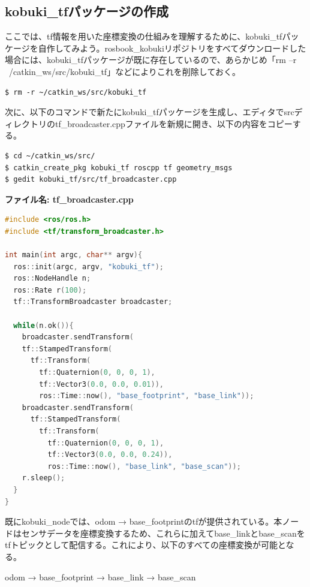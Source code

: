 \subsection{kobuki\_tfパッケージの作成}

ここでは、tf情報を用いた座標変換の仕組みを理解するために、kobuki\_tfパッケージを自作してみよう。rosbook\_kobukiリポジトリをすべてダウンロードした場合には、kobuki\_tfパッケージが既に存在しているので、あらかじめ「rm –r ~/catkin\_ws/src/kobuki\_tf」などによりこれを削除しておく。

\begin{lstlisting}[language=ROS]
$ rm -r ~/catkin_ws/src/kobuki_tf
\end{lstlisting}

次に、以下のコマンドで新たにkobuki\_tfパッケージを生成し、エディタでsrcディレクトリのtf\_broadcaster.cppファイルを新規に開き、以下の内容をコピーする。

\begin{lstlisting}[language=ROS]
$ cd ~/catkin_ws/src/
$ catkin_create_pkg kobuki_tf roscpp tf geometry_msgs
$ gedit kobuki_tf/src/tf_broadcaster.cpp
\end{lstlisting}

\textbf{ファイル名: tf\_broadcaster.cpp}

\begin{lstlisting}[language=C++]
#include <ros/ros.h>
#include <tf/transform_broadcaster.h>

int main(int argc, char** argv){
  ros::init(argc, argv, "kobuki_tf");
  ros::NodeHandle n;
  ros::Rate r(100);
  tf::TransformBroadcaster broadcaster;

  while(n.ok()){
    broadcaster.sendTransform(
    tf::StampedTransform(
      tf::Transform(
        tf::Quaternion(0, 0, 0, 1),
        tf::Vector3(0.0, 0.0, 0.01)),
        ros::Time::now(), "base_footprint", "base_link"));
    broadcaster.sendTransform(
      tf::StampedTransform(
        tf::Transform(
          tf::Quaternion(0, 0, 0, 1),
          tf::Vector3(0.0, 0.0, 0.24)),
          ros::Time::now(), "base_link", "base_scan"));
    r.sleep();
  }
}
\end{lstlisting}

既にkobuki\_nodeでは、odom → base\_footprintのtfが提供されている。本ノードはセンサデータを座標変換するため、これらに加えてbase\_linkとbase\_scanをtfトピックとして配信する。これにより、以下のすべての座標変換が可能となる。

odom → base\_footprint → base\_link → base\_scan

